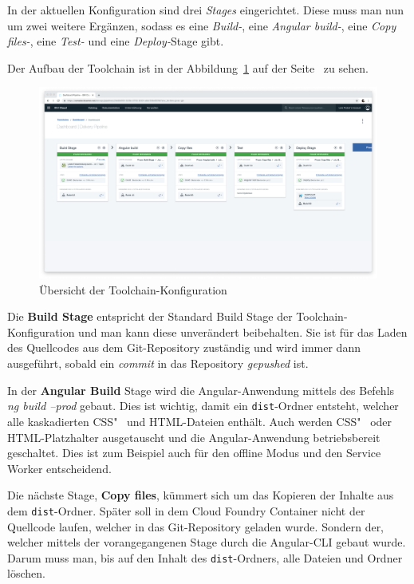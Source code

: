 In der aktuellen Konfiguration sind drei \textit{Stages} eingerichtet. Diese muss man nun um zwei weitere Ergänzen,
sodass es eine \textit{Build-}, eine \textit{Angular build-}, eine \textit{Copy files-}, eine \textit{Test-} und eine
\textit{Deploy-}Stage gibt.

Der Aufbau der Toolchain ist in der Abbildung~\ref{fig:umsetzung_toolchain_pipeline_frontend} auf der
Seite~\pageref{fig:umsetzung_toolchain_pipeline_frontend} zu sehen.

\begin{figure}[h]
    \centering
    \includegraphics[width=\textwidth]{images/kapitel_4/toolchain_pipeline.png}
    \caption{Übersicht der Toolchain-Konfiguration}
    \label{fig:umsetzung_toolchain_pipeline_frontend}
\end{figure}

Die \textbf{Build Stage} entspricht der Standard Build Stage der Toolchain-Konfiguration und man kann diese unverändert
beibehalten. Sie ist für das Laden des Quellcodes aus dem Git-Repository zuständig und wird immer dann ausgeführt,
sobald ein \textit{commit} in das Repository \textit{gepushed} ist.

In der \textbf{Angular Build} Stage wird die Angular-Anwendung mittels des Befehls \textit{ng build --prod} gebaut. Dies
ist wichtig, damit ein \texttt{dist}-Ordner entsteht, welcher alle kaskadierten CSS"~ und HTML-Dateien enthält. Auch
werden CSS"~ oder HTML-Platzhalter ausgetauscht und die Angular-Anwendung betriebsbereit geschaltet. Dies ist zum
Beispiel auch für den offline Modus und den Service Worker entscheidend.

Die nächste Stage, \textbf{Copy files}, kümmert sich um das Kopieren der Inhalte aus dem \texttt{dist}-Ordner. Später
soll in dem Cloud Foundry Container nicht der Quellcode laufen, welcher in das Git-Repository geladen wurde. Sondern
der, welcher mittels der vorangegangenen Stage durch die Angular-CLI gebaut wurde. Darum muss man, bis auf den Inhalt
des \texttt{dist}-Ordners, alle Dateien und Ordner löschen.


